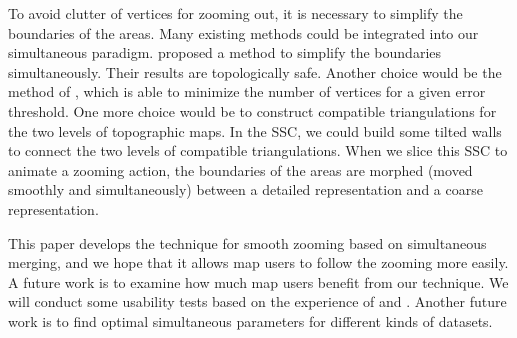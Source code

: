 \documentclass[twocolumn]{svjour3}          %
\begin{document}
To avoid clutter of vertices for zooming out, 
it is necessary to simplify the boundaries of the areas.
Many existing methods could be integrated into our simultaneous paradigm.
\citet{Meijers2011LineSimp} proposed a method 
to simplify the boundaries simultaneously. 
Their results are topologically safe. 
Another choice would be the method of \citet{ImaiIri1988},
which is able to minimize the number of vertices 
for a given error threshold.
One more choice would be to construct compatible triangulations 
\citep[see][]{Peng2019Thesis}
for the two levels of topographic maps.
In the SSC, we could build some tilted walls 
to connect the two levels of compatible triangulations.
When we slice this SSC to animate a zooming action,
the boundaries of the areas are morphed 
(moved smoothly and simultaneously)
between a detailed representation and a coarse representation.



This paper develops the technique for smooth zooming based on simultaneous merging,
and we hope that it allows map users to follow the zooming more easily.
A future work is to examine 
how much map users benefit from our technique.
We will conduct some usability tests based on the experience of
\citet[]{Suba2017Thesis} and \citet{Midtbo2007}.
Another future work is to find optimal simultaneous parameters for 
different kinds of datasets.



\end{document}
